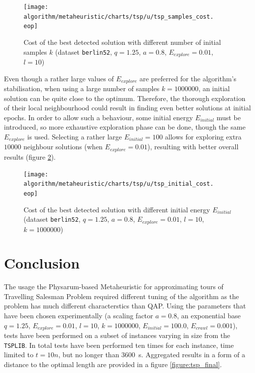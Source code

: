 \documentclass[english,a4paper,twoside]{ppfcmthesis}
\begin{document}
\begin{figure}
  \centering

  \texttt{[image: algorithm/metaheuristic/charts/tsp/u/tsp\_samples\_cost.\\eop]}

  \caption{Cost of the best detected solution with different number of initial samples $k$ (dataset \texttt{berlin52}, $q=1.25$, $a=0.8$, $E_{explore}=0.01$, $l=10$)}
  \label{figure:tsp_samples_cost}
\end{figure}

Even though a rather large values of $E_{explore}$ are preferred for the algorithm's stabilisation, when using a large number of samples $k=1000000$, an initial solution can be quite close to the optimum. Therefore, the thorough exploration of their local neighbourhood could result in finding even better solutions at initial epochs. In order to allow such a behaviour, some initial energy $E_{initial}$ must be introduced, so more exhaustive exploration phase can be done, though the same $E_{explore}$ is used. Selecting a rather large $E_{initial}=100$ allows for exploring extra $10000$ neighbour solutions (when $E_{explore}=0.01$), resulting with better overall results (figure \ref{figure:tsp_initial_cost}).

\begin{figure}
  \centering

  \texttt{[image: algorithm/metaheuristic/charts/tsp/u/tsp\_initial\_cost.\\eop]}

  \caption{Cost of the best detected solution with different initial energy $E_{initial}$ (dataset \texttt{berlin52}, $q=1.25$, $a=0.8$, $E_{explore}=0.01$, $l=10$, $k=1000000$)}
  \label{figure:tsp_initial_cost}
\end{figure}

\section*{Conclusion}

The usage the Physarum-based Metaheuristic for approximating tours of Travelling Salesman Problem required different tuning of the algorithm as the problem has much different characterstics than QAP. Using the parameters that have been chosen experimentally (a scaling factor $a=0.8$, an exponential base $q=1.25$, $E_{explore}=0.01$, $l=10$, $k=1000000$, $E_{initial}=100.0$, $E_{crawl}=0.001$), tests have been performed on a subset of instances varying in size from the \texttt{TSPLIB}. In total tests have been performed ten times for each instance, time limited to $t=10n$, but no longer than 3600~s. Aggregated results in a form of a distance to the optimal length are provided in a figure \ref{figure:tsp_final}.
\end{document}
